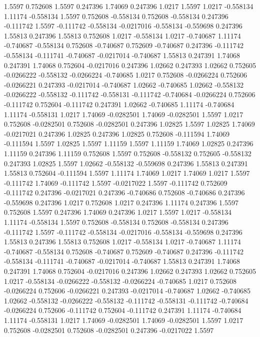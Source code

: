 1.5597 0.752608
1.5597 0.247396
1.74069 0.247396
1.0217 1.5597
1.0217 -0.558134
1.11174 -0.558134
1.5597 0.752608
-0.558134 0.752608
-0.558134 0.247396
-0.111742 1.5597
-0.111742 -0.558134
-0.0217016 -0.558134
-0.559698 0.247396
1.55813 0.247396
1.55813 0.752608
1.0217 -0.558134
1.0217 -0.740687
1.11174 -0.740687
-0.558134 0.752608
-0.740687 0.752609
-0.740687 0.247396
-0.111742 -0.558134
-0.111741 -0.740687
-0.0217014 -0.740687
1.55813 0.247391
1.74068 0.247391
1.74068 0.752604
-0.0217016 0.247396
1.02662 0.247393
1.02662 0.752605
-0.0266222 -0.558132
-0.0266224 -0.740685
1.0217 0.752608
-0.0266224 0.752606
-0.0266221 0.247393
-0.0217014 -0.740687
1.02662 -0.740685
1.02662 -0.558132
-0.0266222 -0.558132
-0.111742 -0.558131
-0.111742 -0.740684
-0.0266224 0.752606
-0.111742 0.752604
-0.111742 0.247391
1.02662 -0.740685
1.11174 -0.740684
1.11174 -0.558131
1.0217 1.74069
-0.0282501 1.74069
-0.0282501 1.5597
1.0217 0.752608
-0.0282501 0.752608
-0.0282501 0.247396
1.02825 1.5597
1.02825 1.74069
-0.0217021 0.247396
1.02825 0.247396
1.02825 0.752608
-0.111594 1.74069
-0.111594 1.5597
1.02825 1.5597
1.11159 1.5597
1.11159 1.74069
1.02825 0.247396
1.11159 0.247396
1.11159 0.752608
1.5597 0.752608
-0.558132 0.752605
-0.558132 0.247393
1.02825 1.5597
1.02662 -0.558132
-0.559698 0.247396
1.55813 0.247391
1.55813 0.752604
-0.111594 1.5597
1.11174 1.74069
1.0217 1.74069
1.0217 1.5597
-0.111742 1.74069
-0.111742 1.5597
-0.0217022 1.5597
-0.111742 0.752609
-0.111742 0.247396
-0.0217021 0.247396
-0.740686 0.752608
-0.740686 0.247396
-0.559698 0.247396
1.0217 0.752608
1.0217 0.247396
1.11174 0.247396
1.5597 0.752608
1.5597 0.247396
1.74069 0.247396
1.0217 1.5597
1.0217 -0.558134
1.11174 -0.558134
1.5597 0.752608
-0.558134 0.752608
-0.558134 0.247396
-0.111742 1.5597
-0.111742 -0.558134
-0.0217016 -0.558134
-0.559698 0.247396
1.55813 0.247396
1.55813 0.752608
1.0217 -0.558134
1.0217 -0.740687
1.11174 -0.740687
-0.558134 0.752608
-0.740687 0.752609
-0.740687 0.247396
-0.111742 -0.558134
-0.111741 -0.740687
-0.0217014 -0.740687
1.55813 0.247391
1.74068 0.247391
1.74068 0.752604
-0.0217016 0.247396
1.02662 0.247393
1.02662 0.752605
1.0217 -0.558134
-0.0266222 -0.558132
-0.0266224 -0.740685
1.0217 0.752608
-0.0266224 0.752606
-0.0266221 0.247393
-0.0217014 -0.740687
1.02662 -0.740685
1.02662 -0.558132
-0.0266222 -0.558132
-0.111742 -0.558131
-0.111742 -0.740684
-0.0266224 0.752606
-0.111742 0.752604
-0.111742 0.247391
1.11174 -0.740684
1.11174 -0.558131
1.0217 1.74069
-0.0282501 1.74069
-0.0282501 1.5597
1.0217 0.752608
-0.0282501 0.752608
-0.0282501 0.247396
-0.0217022 1.5597
